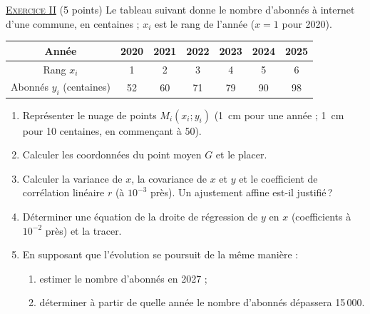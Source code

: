 \noindent \underline{\textsc{Exercice II}} (5 points) \newline
Le tableau suivant donne le nombre d'abonn\'es \`a internet d'une commune, en centaines ;
$x_i$ est le rang de l'ann\'ee ($x = 1$ pour 2020).
\begin{center}
\begin{tabular}{|c|c|c|c|c|c|c|}
\hline
Ann\'ee & 2020 & 2021 & 2022 & 2023 & 2024 & 2025 \\
\hline
Rang $x_i$ & 1 & 2 & 3 & 4 & 5 & 6 \\
\hline
Abonn\'es $y_i$ (centaines) & 52 & 60 & 71 & 79 & 90 & 98 \\
\hline
\end{tabular}
\end{center}
\begin{enumerate}
      \item Repr\'esenter le nuage de points $M_i(x_i ; y_i)$ (1~cm pour une ann\'ee ; 1~cm pour 10 centaines, en commen\c{c}ant \`a 50).
      \item Calculer les coordonn\'ees du point moyen $G$ et le placer.
      \item Calculer la variance de $x$, la covariance de $x$ et $y$ et le coefficient de corr\'elation lin\'eaire $r$
            (\`a $10^{-3}$ pr\`es). Un ajustement affine est-il justifi\'e\,?
      \item D\'eterminer une \'equation de la droite de r\'egression de $y$ en $x$ (coefficients \`a $10^{-2}$ pr\`es) et la tracer.
      \item En supposant que l'\'evolution se poursuit de la m\^eme mani\`ere :
            \begin{enumerate}
            \item estimer le nombre d'abonn\'es en 2027 ;
            \item d\'eterminer \`a partir de quelle ann\'ee le nombre d'abonn\'es d\'epassera 15\,000.
            \end{enumerate}
\end{enumerate}

